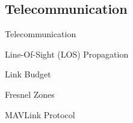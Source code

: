 \subsection{Telecommunication}

\begin{frame}{Telecommunication}{}

  \begin{block}{Line-Of-Sight (LOS) Propagation}

  \end{block}
  
  \begin{block}{Link Budget}

  \end{block}

  \begin{block}{Fresnel Zones}

  \end{block}

  \begin{block}{MAVLink Protocol}

  \end{block}

\end{frame}

